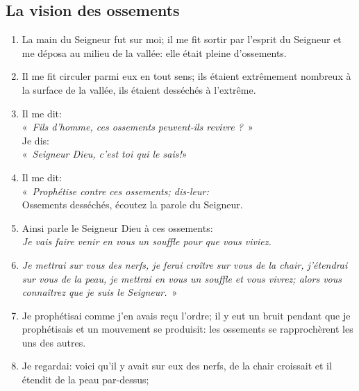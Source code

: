 \subsection*{La vision des ossements}
\begin{enumerate}[leftmargin=\psleftmargin, labelsep = \pslabelsep, label={\arabic*}, font=\color{\pscolor}\small\textsuperscript, parsep=0em, itemsep=0em, topsep=0em ]
  \item {}La main du Seigneur fut sur moi; \brk
        il me fit sortir par l’esprit du Seigneur \brk
        et me déposa au milieu de la vallée: \brk
        elle était pleine d’ossements.
  \item {}Il me fit circuler parmi eux en tout sens; \brk
        ils étaient extrêmement nombreux à la surface de la vallée, \brk
        ils étaient desséchés à l'extrême.\verseSpace
  \item {}Il me dit: \\
        «~\textit{Fils d’homme, ces ossements peuvent-ils revivre ?}~» \\
        Je dis: \\
        «~\textit{Seigneur Dieu, c’est toi qui le sais!}»
  \item {}Il me dit: \\
        «~\textit{Prophétise contre ces ossements; \brk
          dis-leur:} \\
        Ossements desséchés, écoutez la parole du Seigneur.
  \item {}Ainsi parle le Seigneur Dieu à ces ossements: \\
        \textit{Je vais faire venir en vous un souffle pour que vous viviez.}
  \item {}\textit{Je mettrai sur vous des nerfs, \brk
          je ferai croître sur vous de la chair, \brk
          j’étendrai sur vous de la peau, \brk
          je mettrai en vous un souffle et vous vivrez; \brk
          alors vous connaîtrez que je suis le Seigneur.}~»
  \item {}Je prophétisai comme j’en avais reçu l’ordre; \brk
        il y eut un bruit pendant que je prophétisais \brk
        et un mouvement se produisit: \brk
        les ossements se rapprochèrent les uns des autres.
  \item {}Je regardai: \brk
        voici qu’il y avait sur eux des nerfs, \brk
        de la chair croissait \brk
        et il étendit de la peau par-dessus; \brk

\end{enumerate}
